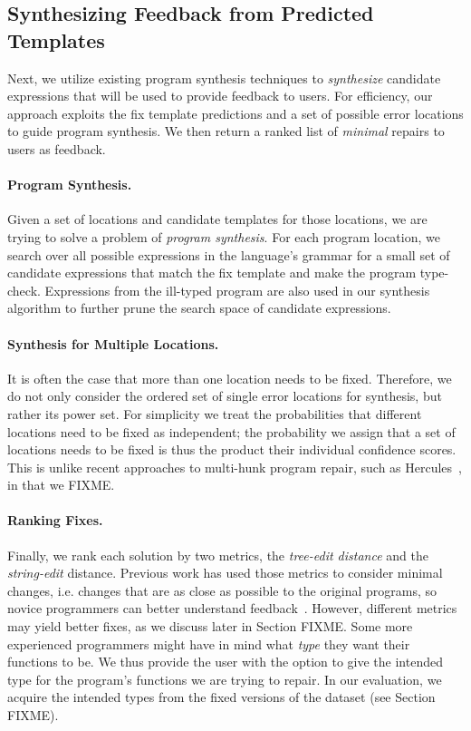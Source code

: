 \subsection{Synthesizing Feedback from Predicted Templates}
\label{sec:overview:synthesis}

Next, we utilize existing program synthesis techniques to \emph{synthesize}
candidate expressions that will be used to provide feedback to users. For efficiency, our
approach exploits the fix template predictions and a set of possible error
locations to guide program synthesis. We then
return a ranked list of \emph{minimal} repairs to users as feedback.

\paragraph{Program Synthesis.} Given a set of locations and candidate templates for
those locations, we are trying to solve a problem of \emph{program synthesis}.
For each program location, we search over all possible
expressions in the language's grammar for a small set of candidate
expressions that match the fix template and make the program type-check.
Expressions from the ill-typed program are also used in our synthesis algorithm
to further prune the search space of candidate expressions.

\paragraph{Synthesis for Multiple Locations.}
It is often the case that more than one location
needs to be fixed. Therefore, we do not only consider the ordered set
of single error locations for synthesis, but rather its power set.
For simplicity we treat the probabilities that different locations need to be fixed
as independent; the probability we assign that a set of locations needs to be fixed
is thus the product their individual confidence scores. This is unlike
recent approaches to multi-hunk program repair, such as
Hercules~\cite{FIXME}, in that we FIXME.

\paragraph{Ranking Fixes.} Finally, we rank each solution by two metrics, the
\emph{tree-edit distance} and the \emph{string-edit} distance. Previous work has
used those metrics to consider minimal changes, i.e. changes that are as close
as possible to the original programs, so novice programmers can better
understand feedback~\cite{FIXME}. However, different metrics may yield better
fixes, as we discuss later in Section FIXME. Some more experienced programmers
might have in mind what \emph{type} they want their functions to be. We thus
provide the user with the option to give the intended type for the program's
functions we are trying to repair. In our evaluation, we acquire the intended
types from the fixed versions of the dataset (see Section FIXME).

